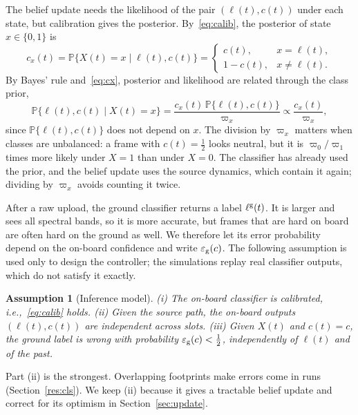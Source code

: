 \documentclass[10pt,journal,compsoc]{IEEEtran}
\newtheorem{assumption}{Assumption}
\theoremstyle{remark}
\newcommand{\Prob}{\mathbb{P}}
\newcommand{\lab}{\ell}
\newcommand{\ee}{\varepsilon}
\begin{document}
The belief update needs the likelihood of the pair $(\lab(t),c(t))$ under each state, but calibration gives the posterior. By~\eqref{eq:calib}, the posterior of state $x\in\{0,1\}$ is
\begin{equation}\label{eq:cx}
c_x(t)=\Prob\big\{X(t)=x\mid\lab(t),c(t)\big\}=\begin{cases}c(t), & x=\lab(t),\\ 1-c(t), & x\neq\lab(t).\end{cases}
\end{equation}
By Bayes' rule and~\eqref{eq:cx}, posterior and likelihood are related through the class prior,
\begin{equation}\label{eq:lik}
\Prob\big\{\lab(t),c(t)\mid X(t)=x\big\}=\frac{c_x(t)\,\Prob\big\{\lab(t),c(t)\big\}}{\varpi_x}\propto\frac{c_x(t)}{\varpi_x},
\end{equation}
since $\Prob\{\lab(t),c(t)\}$ does not depend on $x$. The division by $\varpi_x$ matters when classes are unbalanced: a frame with $c(t)=\frac12$ looks neutral, but it is $\varpi_0/\varpi_1$ times more likely under $X=1$ than under $X=0$. The classifier has already used the prior, and the belief update uses the source dynamics, which contain it again; dividing by $\varpi_x$ avoids counting it twice.

After a raw upload, the ground classifier returns a label $\lab^{\rm g}(t)$. It is larger and sees all spectral bands, so it is more accurate, but frames that are hard on board are often hard on the ground as well. We therefore let its error probability depend on the on-board confidence and write $\ee_{\rm g}(c)$. The following assumption is used only to design the controller; the simulations replay real classifier outputs, which do not satisfy it exactly.



\begin{assumption}[Inference model]\label{as:inf}
(i) The on-board classifier is calibrated, i.e.,~\eqref{eq:calib} holds. (ii) Given the source path, the on-board outputs $(\lab(t),c(t))$ are independent across slots. (iii) Given $X(t)$ and $c(t)=c$, the ground label is wrong with probability $\ee_{\rm g}(c)<\tfrac12$, independently of $\lab(t)$ and of the past.
\end{assumption}

Part (ii) is the strongest. Overlapping footprints make errors come in runs (Section~\ref{res:cls}). We keep (ii) because it gives a tractable belief update and correct for its optimism in Section~\ref{sec:update}.
\end{document}
